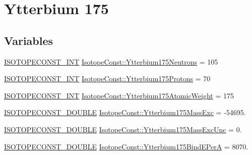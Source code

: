 \hypertarget{group___isotope_const-_ytterbium-_yb175}{}\section{Ytterbium 175}
\label{group___isotope_const-_ytterbium-_yb175}
\subsection*{Variables}
\begin{DoxyCompactItemize}
\item 
\mbox{\hyperlink{group___isotope_const-_macros_ga5f18360b3e99483a35c32d789e62621c}{I\+S\+O\+T\+O\+P\+E\+C\+O\+N\+S\+T\+\_\+\+I\+NT}} \mbox{\hyperlink{group___isotope_const-_ytterbium-_yb175_ga27f2d8555f8528b1ac5ed8b895b89ff8}{Isotope\+Const\+::\+Ytterbium175\+Neutrons}} = 105
\item 
\mbox{\hyperlink{group___isotope_const-_macros_ga5f18360b3e99483a35c32d789e62621c}{I\+S\+O\+T\+O\+P\+E\+C\+O\+N\+S\+T\+\_\+\+I\+NT}} \mbox{\hyperlink{group___isotope_const-_ytterbium-_yb175_gad826bae12093be965e2bd3c144ea4efc}{Isotope\+Const\+::\+Ytterbium175\+Protons}} = 70
\item 
\mbox{\hyperlink{group___isotope_const-_macros_ga5f18360b3e99483a35c32d789e62621c}{I\+S\+O\+T\+O\+P\+E\+C\+O\+N\+S\+T\+\_\+\+I\+NT}} \mbox{\hyperlink{group___isotope_const-_ytterbium-_yb175_ga686878a38618e4bc89a0416bd9104eab}{Isotope\+Const\+::\+Ytterbium175\+Atomic\+Weight}} = 175
\item 
\mbox{\hyperlink{group___isotope_const-_macros_ga8f45a7272ce02c0b4c65c44636ed719a}{I\+S\+O\+T\+O\+P\+E\+C\+O\+N\+S\+T\+\_\+\+D\+O\+U\+B\+LE}} \mbox{\hyperlink{group___isotope_const-_ytterbium-_yb175_gad49fa45c44f28e4eb9bb3c4eb1888ca9}{Isotope\+Const\+::\+Ytterbium175\+Mass\+Exc}} = -\/54695.
\item 
\mbox{\hyperlink{group___isotope_const-_macros_ga8f45a7272ce02c0b4c65c44636ed719a}{I\+S\+O\+T\+O\+P\+E\+C\+O\+N\+S\+T\+\_\+\+D\+O\+U\+B\+LE}} \mbox{\hyperlink{group___isotope_const-_ytterbium-_yb175_ga232884a8726b42ab71b293b3bda47ac6}{Isotope\+Const\+::\+Ytterbium175\+Mass\+Exc\+Unc}} = 0.
\item 
\mbox{\hyperlink{group___isotope_const-_macros_ga8f45a7272ce02c0b4c65c44636ed719a}{I\+S\+O\+T\+O\+P\+E\+C\+O\+N\+S\+T\+\_\+\+D\+O\+U\+B\+LE}} \mbox{\hyperlink{group___isotope_const-_ytterbium-_yb175_ga1c5f6b13a598f09617a7cee5e9a5c4ee}{Isotope\+Const\+::\+Ytterbium175\+Bind\+E\+PerA}} = 8070.
\item 

\end{DoxyCompactItemize}
